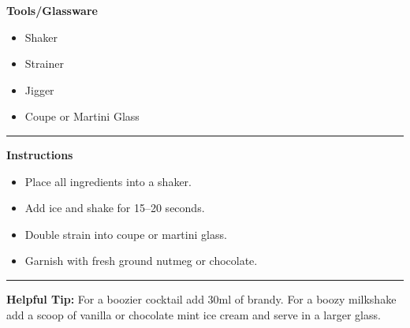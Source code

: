 \hspace{.01\textwidth}\vrule\hspace{.01\textwidth}
\begin{minipage}[t]{.49\textwidth}
    \noindent
    \textbf{\large Tools/Glassware}
    \begin{itemize}
        \item Shaker
        \item Strainer
        \item Jigger
        \item Coupe or Martini Glass
    \end{itemize}
\end{minipage}
\vspace{.5em}\hrule\vspace{.5em}
\noindent
\begin{minipage}{\textwidth}
    \noindent
    \textbf{\large Instructions}
    \begin{itemize}
        \item Place all ingredients into a shaker.
        \item Add ice and shake for 15--20 seconds.
        \item Double strain into coupe or martini glass.
        \item Garnish with fresh ground nutmeg or chocolate.
    \end{itemize}
\end{minipage}
\vspace{.5em}\hrule\vspace{.5em}
\noindent
\textbf{\large Helpful Tip:} For a boozier cocktail add 30ml of brandy. For a boozy milkshake add a scoop of vanilla or chocolate mint ice cream and serve in a larger glass.
\newpage
